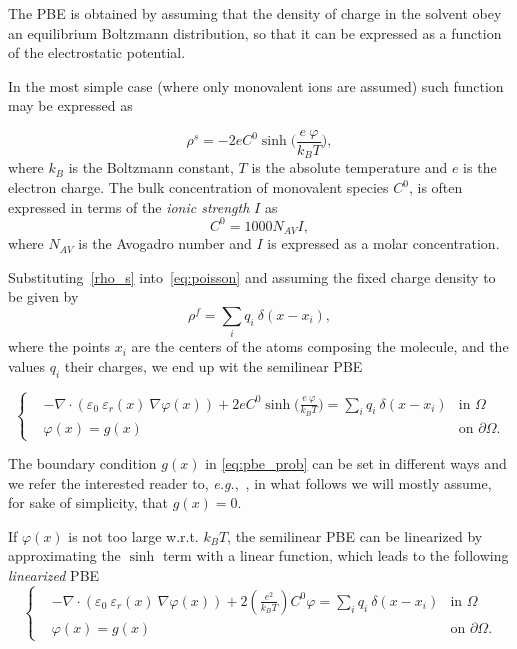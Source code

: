 \documentclass[11pt,a4paper]{article}
\begin{document}
The PBE is obtained by assuming that the density of charge in the solvent 
obey an equilibrium Boltzmann distribution, so that it can be expressed
as a function of the electrostatic potential.

In the most simple case (where only monovalent ions are assumed) such function
may be expressed as

\begin{equation}
 \rho^s = -2 e C^0 \sinh \Big(\frac{e\ \varphi}{k_B T}\Big),
 \label{rho_s}
\end{equation}
 where $k_B$ is the Boltzmann constant, $T$ is the absolute temperature and $e$ is the electron charge. The bulk concentration of monovalent species $C^0$, 
 is often expressed in terms of  the \emph{ionic strength} $I$ as
\begin{equation*}
    C^0 = 1000N_{AV}I,
\end{equation*}
where $N_{AV}$ is the Avogadro number and $I$ is expressed as a 
molar concentration.

Substituting~\eqref{rho_s} into~\eqref{eq:poisson} and assuming the fixed
charge density to be given by 
\begin{equation}
\rho^f = \sum_i q_i\ \delta(x-x_i),
    \label{eq:rhof}
\end{equation}
where the  points $x_i$ are the centers of the atoms composing the molecule, 
and the values $q_i$ their charges, we end up wit the semilinear PBE

\begin{equation}
    \left\{
    \begin{aligned}
     & -\nabla \cdot \left(\varepsilon_0\ \varepsilon_r(x)\ 
    \nabla \varphi(x) \right) + 2 e C^0 \sinh \Big(\frac{e\ \varphi}{k_B T}\Big)  =
    \sum_i q_i\ \delta(x-x_i)
     & \mbox{in } \Omega \\ 
    & \varphi(x) = g(x)  & \mbox{on } \partial \Omega.
    \end{aligned}
    \right.
    \label{eq:pbe_prob}
\end{equation}

The boundary condition $g(x)$ in \eqref{eq:pbe_prob} can be set in different
ways and we refer the interested reader to, {\it e.g.},~\cite{ROCCHIA20051109},
in what follows we will mostly assume, for sake of simplicity, that $g(x) = 0$.

If $\varphi (x)$ is not too large  w.r.t. $k_B T$, the semilinear PBE can be 
linearized by approximating the $\sinh$ term with a linear function, which leads 
to the following \emph{linearized} PBE
\begin{equation}
    \left\{
    \begin{aligned}
     & -\nabla \cdot \left(\varepsilon_0\ \varepsilon_r(x)\ 
    \nabla \varphi(x) \right) + 2 \left(\frac{e^2}{k_B T}\right) C^0 \varphi  =
    \sum_i q_i\ \delta(x-x_i)
     & \mbox{in } \Omega \\ 
    & \varphi(x) = g(x)  & \mbox{on } \partial \Omega.
    \end{aligned}
    \right.
    \label{eq:linpbe}
\end{equation}
\end{document}
